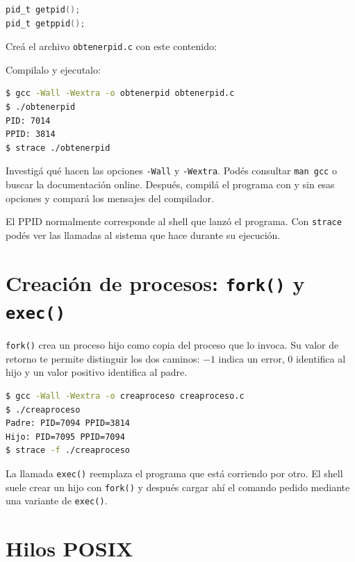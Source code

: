 \documentclass[11pt,a4paper]{article}
\newcommand{\inputcode}[2][]{%
  \par\noindent\begin{minipage}{\linewidth}
    
  \end{minipage}\par}
\begin{document}
\begin{lstlisting}[language=C]
pid_t getpid();
pid_t getppid();
\end{lstlisting}

Creá el archivo \texttt{obtenerpid.c} con este contenido:

\inputcode[language=C]{../examples/tp2/processes/obtenerpid.c}

Compilalo y ejecutalo:

\begin{lstlisting}[language=bash]
$ gcc -Wall -Wextra -o obtenerpid obtenerpid.c
$ ./obtenerpid
PID: 7014
PPID: 3814
$ strace ./obtenerpid
\end{lstlisting}

\begin{extrabox}
Investigá qué hacen las opciones \texttt{-Wall} y \texttt{-Wextra}. Podés consultar \texttt{man gcc} o buscar la documentación online. Después, compilá el programa con y sin esas opciones y compará los mensajes del compilador.
\end{extrabox}

El PPID normalmente corresponde al shell que lanzó el programa. Con \texttt{strace} podés ver las llamadas al sistema que hace durante su ejecución.

\section{Creación de procesos: \texttt{fork()} y \texttt{exec()} }

\texttt{fork()} crea un proceso hijo como copia del proceso que lo invoca. Su valor de retorno te permite distinguir los dos caminos: $-1$ indica un error, $0$ identifica al hijo y un valor positivo identifica al padre.

\inputcode[language=C]{../examples/tp2/processes/creaproceso.c}

\begin{lstlisting}[language=bash]
$ gcc -Wall -Wextra -o creaproceso creaproceso.c
$ ./creaproceso
Padre: PID=7094 PPID=3814
Hijo: PID=7095 PPID=7094
$ strace -f ./creaproceso
\end{lstlisting}

La llamada \texttt{exec()} reemplaza el programa que está corriendo por otro. El shell suele crear un hijo con \texttt{fork()} y después cargar ahí el comando pedido mediante una variante de \texttt{exec()}.

\section{Hilos POSIX}
\end{document}
